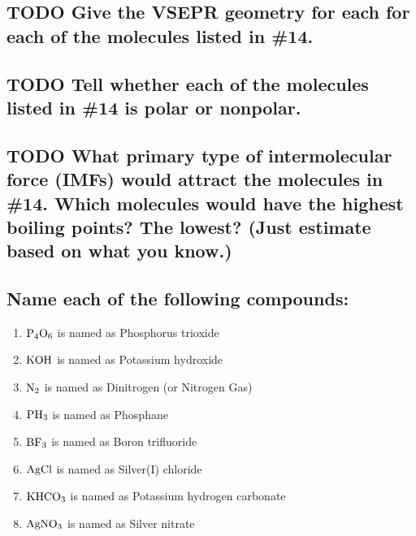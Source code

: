 \documentclass[11pt]{article}
\begin{document}
\subsection{{\bfseries\sffamily TODO} Give the VSEPR geometry for each for each of the molecules listed in \#14.}
\label{sec:orge3657e3}

\subsection{{\bfseries\sffamily TODO} Tell whether each of the molecules listed in \#14 is polar or nonpolar.}
\label{sec:org49b2d7c}

\subsection{{\bfseries\sffamily TODO} What primary type of intermolecular force (IMFs) would attract the molecules in \#14. Which molecules would have the highest boiling points? The lowest? (Just estimate based on what you know.)}
\label{sec:org6e616b2}

\subsection{Name each of the following compounds:}
\label{sec:org45db427}
\begin{enumerate}
\item \(\ce{P4O6}\) is named as Phosphorus trioxide
\item \(\ce{KOH}\) is named as Potassium hydroxide
\item \(\ce{N2}\) is named as Dinitrogen (or Nitrogen Gas)
\item \(\ce{PH3}\) is named as Phosphane
\item \(\ce{BF3}\) is named as Boron trifluoride
\item \(\ce{AgCl}\) is named as Silver(I) chloride
\item \(\ce{KHCO3}\) is named as Potassium hydrogen carbonate
\item \(\ce{AgNO3}\) is named as Silver nitrate
\end{enumerate}
\end{document}
